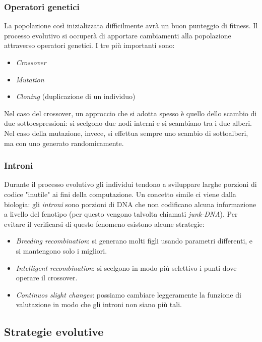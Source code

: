 \documentclass[10pt,a4paper]{article}
\begin{document}
\subsubsection{Operatori genetici}

La popolazione così inizializzata difficilmente avrà un buon punteggio di fitness. Il processo evolutivo si occuperà di apportare cambiamenti alla popolazione attraverso operatori genetici. I tre più importanti sono:

\begin{itemize}
\item{\emph{Crossover}}
\item{\emph{Mutation}}
\item{\emph{Cloning} (duplicazione di un individuo)}
\end{itemize}

Nel caso del crossover, un approccio che si adotta spesso è quello dello scambio di due sottoespressioni: si scelgono due nodi interni e si scambiano tra i due alberi. Nel caso della mutazione, invece, si effettua sempre uno scambio di sottoalberi, ma con uno generato randomicamente.  

\subsubsection{Introni}

Durante il processo evolutivo gli individui tendono a sviluppare larghe porzioni di codice "inutile" ai fini della computazione. Un concetto simile ci viene dalla biologia: gli \emph{introni} sono porzioni di DNA che non codificano alcuna informazione a livello del fenotipo (per questo vengono talvolta chiamati \emph{junk-DNA}). Per evitare il verificarsi di questo fenomeno esistono alcune strategie:

\begin{itemize}
\item{\emph{Breeding recombination}: si generano molti figli usando parametri differenti, e si mantengono solo i migliori.}
\item{\emph{Intelligent recombination}: si scelgono in modo più selettivo i punti dove operare il crossover.}
\item{\emph{Continuos slight changes}: possiamo cambiare leggeramente la funzione di valutazione in modo che gli introni non siano più tali.}
\end{itemize}

\subsection{Strategie evolutive}
\end{document}

